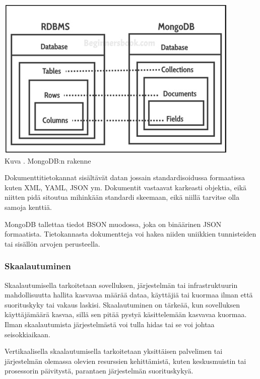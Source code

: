 \bigskip
\includegraphics{src/public/oppar/mongodb-structure.jpg} \\
Kuva \getImgCount. MongoDB:n rakenne
\medskip


Dokumenttitietokannat sisältävät datan jossain standardisoidussa formaatissa kuten XML, YAML, JSON ym.
Dokumentit vastaavat karkeasti objektia, eikä niitten pidä sitoutua mihinkään standardi skeemaan, 
eikä niillä tarvitse olla samoja kenttiä.
\medskip


MongoDB tallettaa tiedot BSON muodossa, joka on binäärinen JSON formaatista.
Tietokannasta dokumentteja voi hakea niiden uniikkien tunnisteiden tai sisällön arvojen perusteella.
\medskip






\subsubsection{Skaalautuminen}




Skaalautumisella tarkoitetaan sovelluksen, järjestelmän tai infrastruktuurin
mahdollisuutta hallita kasvavaa määrää dataa, käyttäjiä tai kuormaa ilman että suorituskyky tai vakaus laskisi.
Skaalautuminen on tärkeää, kun sovelluksen käyttäjämäärä kasvaa, sillä sen pitää pystyä käsittelemään kasvavaa kuormaa.
Ilman skaalautumista järjestelmästä voi tulla hidas tai se voi johtaa seisokkiaikaan.
\medskip

Vertikaalisella skaalautumisella tarkoitetaan yksittäisen palvelimen tai järjestelmän olemassa olevien resurssien kehittämistä, 
kuten keskusmuistin tai prosessorin päivitystä, parantaen järjestelmän suorituskykyä.
\medskip

